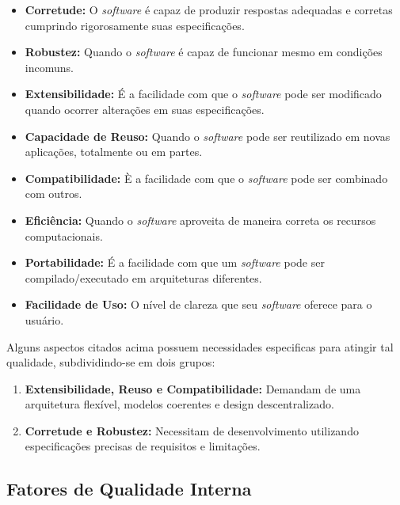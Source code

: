 \documentclass[a4paper, 12pt]{article}
\begin{document}
	 \begin{itemize}
	 	\item \textbf{Corretude:} O \textit{software} é capaz de produzir respostas adequadas e corretas cumprindo rigorosamente suas especificações.
	 	
	 	\item \textbf{Robustez:} Quando o \textit{software} é capaz de funcionar mesmo em condições incomuns.
	 	
	 	\item \textbf{Extensibilidade:} É a facilidade com que o \textit{software} pode ser modificado quando ocorrer alterações em suas especificações.
	 
		\item \textbf{Capacidade de Reuso:} Quando o \textit{software} pode ser reutilizado em novas aplicações, totalmente ou em partes.
		
		\item \textbf{Compatibilidade:} È a facilidade com que o \textit{software} pode ser combinado com outros.
		
		\item \textbf{Eficiência:} Quando o \textit{software} aproveita de maneira correta os recursos computacionais.
		
		\item \textbf{Portabilidade:} É a facilidade com que um \textit{software} pode ser compilado/executado em arquiteturas diferentes.
		
		\item \textbf{Facilidade de Uso:} O nível de clareza que seu \textit{software} oferece para o usuário.
	\end{itemize}

			Alguns aspectos citados acima possuem necessidades especificas para atingir tal qualidade, subdividindo-se em dois grupos:
	
	\begin{enumerate}
		\item \textbf{Extensibilidade, Reuso e Compatibilidade:} Demandam de uma arquitetura flexível, modelos coerentes e design descentralizado.
		
		\item \textbf{Corretude e Robustez:} Necessitam de desenvolvimento utilizando especificações precisas de requisitos e limitações.
	\end{enumerate}

	\subsection{Fatores de Qualidade Interna}
		
\end{document}
